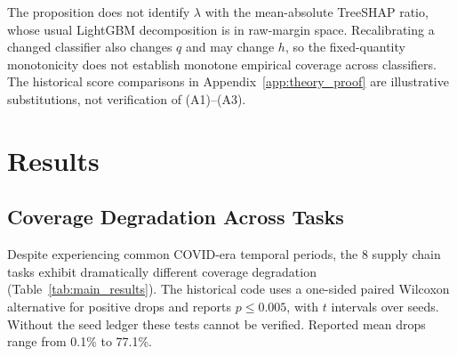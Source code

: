 \documentclass[accepted]{uai2026} %
\begin{document}
The proposition does not identify $\lambda$ with the mean-absolute TreeSHAP ratio, whose usual LightGBM decomposition is in raw-margin space. Recalibrating a changed classifier also changes $q$ and may change $h$, so the fixed-quantity monotonicity does not establish monotone empirical coverage across classifiers. The historical score comparisons in Appendix~\ref{app:theory_proof} are illustrative substitutions, not verification of (A1)--(A3).

\section{Results}\label{sec:results}

\subsection{Coverage Degradation Across Tasks}

Despite experiencing common COVID-era temporal periods, the 8 supply chain tasks exhibit dramatically different coverage degradation (Table~\ref{tab:main_results}). The historical code uses a one-sided paired Wilcoxon alternative for positive drops and reports $p\leq0.005$, with $t$ intervals over seeds. Without the seed ledger these tests cannot be verified. Reported mean drops range from 0.1\% to 77.1\%.
\end{document}
